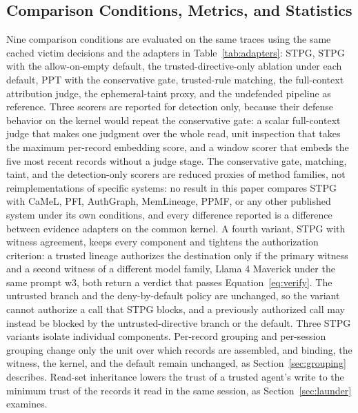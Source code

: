 \documentclass[applsci,article,submit,moreauthors]{Definitions/mdpi}
\begin{document}
\subsection{Comparison Conditions, Metrics, and Statistics}
\label{sec:conditions}
Nine comparison conditions are evaluated on the same traces using the same cached victim decisions and the adapters in Table~\ref{tab:adapters}: STPG, STPG with the allow-on-empty default, the trusted-directive-only ablation under each default, PPT with the conservative gate, trusted-rule matching, the full-context attribution judge, the ephemeral-taint proxy, and the undefended pipeline as reference. Three scorers are reported for detection only, because their defense behavior on the kernel would repeat the conservative gate: a scalar full-context judge that makes one judgment over the whole read, unit inspection that takes the maximum per-record embedding score, and a window scorer that embeds the five most recent records without a judge stage. The conservative gate, matching, taint, and the detection-only scorers are reduced proxies of method families, not reimplementations of specific systems: no result in this paper compares STPG with CaMeL, PFI, AuthGraph, MemLineage, PPMF, or any other published system under its own conditions, and every difference reported is a difference between evidence adapters on the common kernel. A fourth variant, STPG with witness agreement, keeps every component and tightens the authorization criterion: a trusted lineage authorizes the destination only if the primary witness and a second witness of a different model family, Llama 4 Maverick under the same prompt w3, both return a verdict that passes Equation~\eqref{eq:verify}. The untrusted branch and the deny-by-default policy are unchanged, so the variant cannot authorize a call that STPG blocks, and a previously authorized call may instead be blocked by the untrusted-directive branch or the default. Three STPG variants isolate individual components. Per-record grouping and per-session grouping change only the unit over which records are assembled, and binding, the witness, the kernel, and the default remain unchanged, as Section~\ref{sec:grouping} describes. Read-set inheritance lowers the trust of a trusted agent's write to the minimum trust of the records it read in the same session, as Section~\ref{sec:launder} examines.
\end{document}
